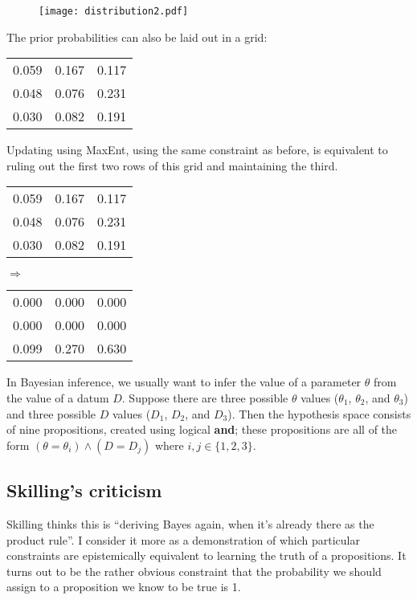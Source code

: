 \documentclass[a4paper, 11pt]{article}
\begin{document}
\begin{figure}
\begin{center}
\texttt{[image: distribution2.pdf]}
\caption{\label{fig:distribution2}}
\end{center}
\end{figure}

The prior probabilities can also be laid out in a grid:

\begin{center}
\begin{tabular}{|ccc|}
\hline
0.059 & 0.167 & 0.117\\
0.048 & 0.076 & 0.231\\
0.030 & 0.082 & 0.191\\
\hline
\end{tabular}
\end{center}

Updating using MaxEnt, using the same constraint as before, is equivalent
to ruling out the first two rows of this grid and maintaining the third.
\begin{center}
\begin{tabular}{|ccc|}
\hline
\rowcolor{Gray}
0.059 & 0.167 & 0.117\\
\rowcolor{Gray}
0.048 & 0.076 & 0.231\\
0.030 & 0.082 & 0.191\\
\hline
\end{tabular}
$\Longrightarrow$
\begin{tabular}{|ccc|}
\hline
0.000 & 0.000 & 0.000\\
0.000 & 0.000 & 0.000\\
0.099 & 0.270 & 0.630\\
\hline
\end{tabular}
\end{center}

In Bayesian inference, we usually want to infer the value of a parameter
$\theta$ from the value of a datum $D$. Suppose there are three possible
$\theta$ values ($\theta_1$, $\theta_2$, and $\theta_3$) and three possible
$D$ values ($D_1$, $D_2$, and $D_3$). Then the hypothesis space
consists of nine propositions, created using logical {\bf and}; these
propositions are all of the form
$(\theta = \theta_i) \wedge (D = D_j)$ where $i, j \in \{1, 2, 3\}$.


\subsection{Skilling's criticism}
Skilling thinks this is ``deriving Bayes again, when it's already there
as the product rule''. I consider it more as a demonstration of which
particular constraints are epistemically equivalent to learning the
truth of a propositions. It turns out to be the rather obvious constraint
that the probability we should assign to a proposition we know to be true
is 1.
\end{document}
